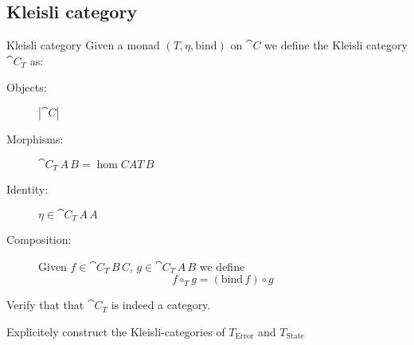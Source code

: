 \documentclass[handout]{beamer}
\begin{document}
\subsection{Kleisli category}

\begin{frame}
  \begin{block}{Kleisli category}
    Given a monad $(T,\eta,\mathrm{bind})$ on $\cat{C}$ we define the 
    Kleisli category $\cat{C}_T$ as:
    \begin{description}
    \item[Objects:] $|\cat{C}|$
    \item[Morphisms:] $\cat{C}_T\,A\,B = \hom{C}{A}{T\,B}$

    \item[Identity:] $\eta \in \cat{C}_T\,A\,A$

    \item[Composition:] Given $f\in \cat{C}_T\,B\,C$, $g\in\cat{C}_T\,A\,B$ we define
      \[ f \circ_T g = (\mathrm{bind}\,f) \circ g\]
    \end{description}
  \end{block}

  \begin{exercise}
    Verify that that $\cat{C}_T$  is indeed a category.
  \end{exercise}

  \begin{exercise}
    Explicitely construct the Kleisli-categories of $T_{\mathrm{Error}}$
    and $T_{\mathrm{State}}$
  \end{exercise}

\end{frame}

\end{document}
